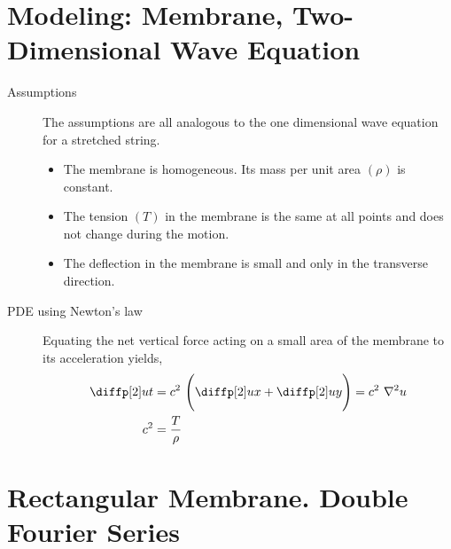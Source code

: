 \section{Modeling: Membrane, Two-Dimensional Wave Equation}

\begin{description}
    \item[Assumptions] The assumptions are all analogous to the one dimensional wave
        equation for a stretched string.
        \begin{itemize}
            \item The membrane is homogeneous. Its mass per unit area $ (\rho) $ is
                  constant.
            \item The tension $ (T) $ in the membrane is the same at all points and does
                  not change during the motion.
            \item The deflection in the membrane is small and only in the
                  transverse direction.
        \end{itemize}

    \item[PDE using Newton's law] Equating the net vertical force acting on a small
        area of the membrane to its acceleration yields,
        \begin{align}
            \diffp[2] ut & = c^2\ \Bigg( \diffp[2] ux + \diffp[2] uy \Bigg)
            = c^2\ \nabla^2 u                                               \\
            c^2          & = \frac{T}{\rho}
        \end{align}
\end{description}

\section{Rectangular Membrane. Double Fourier Series}


